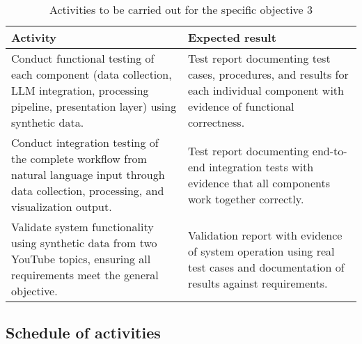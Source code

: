 \begin{table}[htbp]
	\centering
	\small
	\caption{Activities to be carried out for the specific objective 3}
	\label{tab:activities_specific_objective_3}
	\begin{tabularx}{\textwidth}{>{\raggedright\arraybackslash}p{4cm}X}
		\toprule
		\textbf{Activity} & \textbf{Expected result} \\
		\midrule
		Conduct functional testing of each component (data collection, LLM integration, processing pipeline, presentation layer) using synthetic data. & Test report documenting test cases, procedures, and results for each individual component with evidence of functional correctness. \\
		\midrule
		Conduct integration testing of the complete workflow from natural language input through data collection, processing, and visualization output. & Test report documenting end-to-end integration tests with evidence that all components work together correctly. \\
		\midrule
		Validate system functionality using synthetic data from two YouTube topics, ensuring all requirements meet the general objective. & Validation report with evidence of system operation using real test cases and documentation of results against requirements. \\
		\bottomrule
	\end{tabularx}
\end{table}

\subsection{Schedule of activities}
